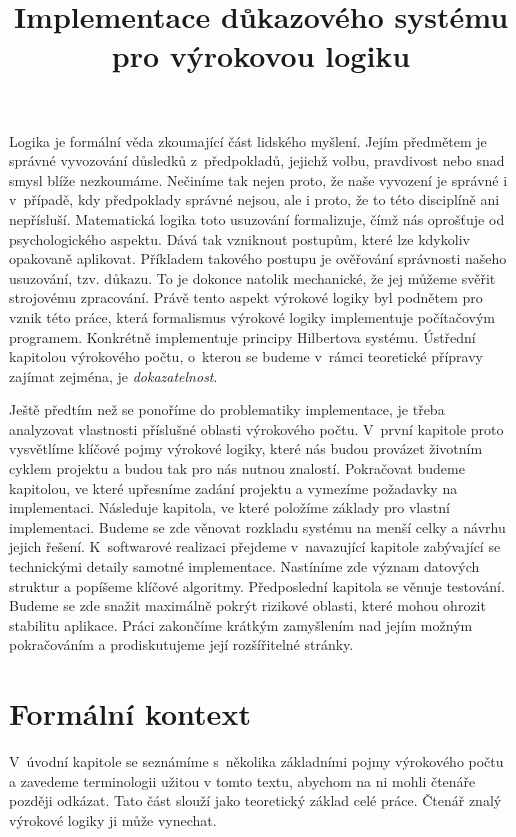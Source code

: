 \documentclass[thesis=B,czech,hidelinks]{thesis}[2012/06/26]
\title{Implementace důkazového systému pro výrokovou logiku}
\begin{document}
\theoremstyle{definition}
\newtheorem{exm}{Příklad}
\newtheorem{dfn}{Definice}

%
%
%

\begin{introduction}
Logika je formální věda zkoumající část lidského myšlení. Jejím předmětem je správné vyvozování důsledků z~předpokladů, jejichž volbu, pravdivost nebo snad smysl blíže nezkoumáme. Nečiníme tak nejen proto, že naše vyvození je správné i v~případě, kdy předpoklady správné nejsou, ale i proto, že to této disciplíně ani nepřísluší. Matematická logika toto usuzování formalizuje, čímž nás oprošťuje od psychologického aspektu. Dává tak vzniknout postupům, které lze kdykoliv opakovaně aplikovat. Příkladem takového postupu je ověřování správnosti našeho usuzování, tzv. důkazu. To je dokonce natolik mechanické, že jej můžeme svěřit strojovému zpracování\cite{sochor}. Právě tento aspekt výrokové logiky byl podnětem pro vznik této práce, která formalismus výrokové logiky implementuje počítačovým programem. Konkrétně implementuje principy Hilbertova systému. Ústřední kapitolou výrokového počtu, o~kterou se budeme v~rámci teoretické přípravy zajímat zejména, je \emph{dokazatelnost}.

Ještě předtím než se ponoříme do problematiky implementace, je třeba analyzovat vlastnosti příslušné oblasti výrokového počtu. V~první kapitole proto vysvětlíme klíčové pojmy výrokové logiky, které nás budou provázet životním cyklem projektu a budou tak pro nás nutnou znalostí. Pokračovat budeme kapitolou, ve které upřesníme zadání projektu a vymezíme požadavky na implementaci. Následuje kapitola, ve které položíme základy pro vlastní implementaci. Budeme se zde věnovat rozkladu systému na menší celky a návrhu jejich řešení. K~softwarové realizaci přejdeme v~navazující kapitole zabývající se technickými detaily samotné implementace. Nastíníme zde význam datových struktur a popíšeme klíčové algoritmy. Předposlední kapitola se věnuje testování. Budeme se zde snažit maximálně pokrýt rizikové oblasti, které mohou ohrozit stabilitu aplikace. Práci zakončíme krátkým zamyšlením nad jejím možným pokračováním a prodiskutujeme její rozšířitelné stránky.
\end{introduction}

%
%
%

\chapter{Formální kontext}

V~úvodní kapitole se seznámíme s~několika základními pojmy výrokového počtu a zavedeme terminologii užitou v tomto textu, abychom na ni mohli čtenáře později odkázat. Tato část slouží jako teoretický základ celé práce. Čtenář znalý výrokové logiky ji může vynechat.
\end{document}
